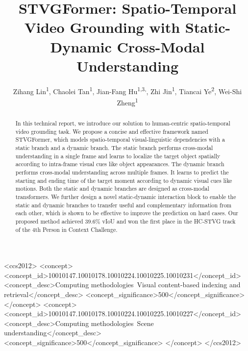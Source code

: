 \documentclass[sigconf]{acmart}
\begin{document}
\title{STVGFormer: Spatio-Temporal Video Grounding with Static-Dynamic Cross-Modal Understanding}

\author{Zihang Lin\textsuperscript{1}, Chaolei Tan\textsuperscript{1}, Jian-Fang Hu\textsuperscript{1,3,}\footnotemark[1], Zhi Jin\textsuperscript{1}, Tiancai Ye\textsuperscript{2}, Wei-Shi Zheng\textsuperscript{1}}


\renewcommand{\shortauthors}{Zihang Lin et al.}

\begin{abstract}
In this technical report, we introduce our solution to human-centric spatio-temporal video grounding task. We propose a concise and effective framework named STVGFormer, which models spatio-temporal visual-linguistic dependencies with a static branch and a dynamic branch. The static branch performs cross-modal understanding in a single frame and learns to localize the target object spatially according to intra-frame visual cues like object appearances. The dynamic branch performs cross-modal understanding across multiple frames. It learns to predict the starting and ending time of the target moment according to dynamic visual cues like motions. Both the static and dynamic branches are designed as cross-modal transformers. We further design a novel static-dynamic interaction block to enable the static and dynamic branches to transfer useful and complementary information from each other, which is shown to be effective to improve the prediction on hard cases. Our proposed method achieved 39.6\% vIoU and won the first place in the HC-STVG track of the 4th Person in Context Challenge.
\end{abstract}



\begin{CCSXML}
<ccs2012>
  <concept>
      <concept_id>10010147.10010178.10010224.10010225.10010231</concept_id>
      <concept_desc>Computing methodologies~Visual content-based indexing and retrieval</concept_desc>
      <concept_significance>500</concept_significance>
      </concept>
  <concept>
      <concept_id>10010147.10010178.10010224.10010225.10010227</concept_id>
      <concept_desc>Computing methodologies~Scene understanding</concept_desc>
      <concept_significance>500</concept_significance>
      </concept>
 </ccs2012>
\end{CCSXML}
\end{document}
